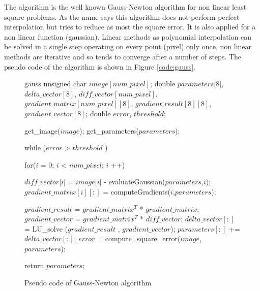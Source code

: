 The algorithm is the well known Gauss-Newton algorithm for non linear least square problems.
As the name says this algorithm does not perform perfect interpolation but tries to reduce as most the square error.
It is also applied for a non linear function (gaussian).
Linear methods as polynomial interpolation can be solved in a single step operating on every point (pixel) only once, non linear methods are iterative and so tends to converge after a  number of steps.
The pseudo code of the algorithm is shown in Figure \ref{code:gauss}.

\begin{figure}[h]
\begin{center} 
\begin{minipage}[c]{.85\textwidth} 
\centering 
\begin{pseudo}{}{gauss}
unsigned char $image[num\_pixel]$;
double $parameters$[8], $delta\_vector[8]$, $diff\_vector[num\_pixel]$, $gradient\_matrix[num\_pixel][8]$, $gradient\_result[8][8]$, $gradient\_vector[8]$;
double $error$, $threshold$;

get_image($image$);
get_parameters($parameters$);

while ($error$ > $threshold$ ) {
    for($i$ = 0; $i$ < $num\_pixel$; $i$ ++){
	
          $diff\_vector$[$i$] = $image$[$i$] - evaluateGaussian($parameters$,$i$); 
          $gradient\_matrix[i][:]$ = computeGradients($i$,$parameters$);
	      
    }
    $gradient\_result$ = $gradient\_matrix^T$ * $gradient\_matrix$;
    $gradient\_vector$ = $gradient\_matrix^T$ * $diff\_vector$;
    $delta\_vector[:]$ = LU_solve ($gradient\_result$ , $gradient\_vector$);
    $parameters[:]$ += $delta\_vector[:]$;
    $error$ = compute_square_error($image$, $parameters$);
}
return $parameters$;

\end{pseudo}
\end{minipage} 
\end{center} 
\caption{Pseudo code of Gauss-Newton algorithm}
\end{figure}

